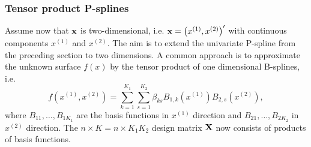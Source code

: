 \documentclass[11pt,a4paper,twoside]{bayesxarticle}
\begin{document}
\subsubsection{Tensor product P-splines}
\label{tensorproductpsplines} Assume now that $\mathbf{x}$ is
two-dimensional, i.e. $\mathbf{x} = \left(x^{(1)},x^{(2)}\right)'$ with
continuous components $x^{(1)}$ and $x^{(2)}$. The aim is to extend
the univariate P-spline from the preceding section to two
dimensions. A common approach is to approximate the unknown surface
$f(x)$ by the tensor product of one dimensional B-splines, i.e.
\begin{equation}
\label{gampspline_2dimterm} f\left(x^{(1)},x^{(2)}\right) = \sum_{k=1}^{K_1}
\sum_{s=1}^{K_2} \beta_{ks} B_{1,k}(x^{(1)})
B_{2,s} (x^{(2)}),
\end{equation}
where $B_{11},\dots,B_{1K_1}$ are the basis functions in $x^{(1)}$ direction and
$B_{21},\dots,B_{2K_2}$ in $x^{(2)}$ direction.
The $n \times K = n \times K_1 K_2$ design matrix $\mathbf{X}$ now consists of
products of basis functions.
\end{document}
